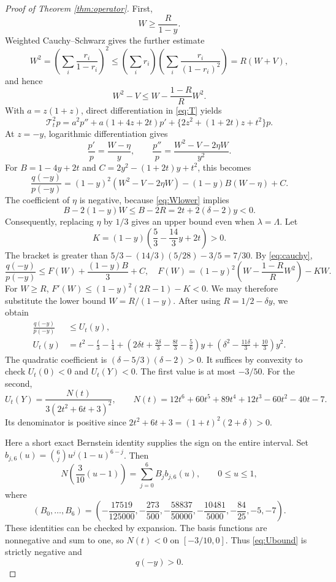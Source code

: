 \documentclass[11pt]{article}
\theoremstyle{remark}
\newcommand{\T}{\mathcal{T}}
\begin{document}
\begin{proof}[Proof of Theorem \ref{thm:operator}]
First,
\begin{equation}\label{eq:Wlower}
 W\ge\frac{R}{1-y}.
\end{equation}
Weighted Cauchy--Schwarz gives the further estimate
\[
 W^2=\left(\sum_i\frac{r_i}{1-r_i}\right)^2
 \le\left(\sum_i r_i\right)
      \left(\sum_i\frac{r_i}{(1-r_i)^2}\right)=R(W+V),
\]
and hence
\begin{equation}\label{eq:cauchy}
 W^2-V\le W-\frac{1-R}{R}W^2.
\end{equation}
With $a=z(1+z)$, direct differentiation in \eqref{eq:T} yields
\[
 \T_t^2p=a^2p''+a(1+4z+2t)p'
              +\{2z^2+(1+2t)z+t^2\}p.
\]
At $z=-y$, logarithmic differentiation gives
\[
 \frac{p'}p=\frac{W-\eta}{y},\qquad
 \frac{p''}p=\frac{W^2-V-2\eta W}{y^2}.
\]
For $B=1-4y+2t$ and $C=2y^2-(1+2t)y+t^2$, this becomes
\begin{equation}\label{eq:quotient}
 \frac{q(-y)}{p(-y)}
 =(1-y)^2(W^2-V-2\eta W)-(1-y)B(W-\eta)+C.
\end{equation}
The coefficient of $\eta$ is negative, because \eqref{eq:Wlower} implies
\[
 B-2(1-y)W\le B-2R=2t+2(\delta-2)y<0.
\]
Consequently, replacing $\eta$ by $1/3$ gives an upper bound even when
$\lambda=\Lambda$. Let
\[
 K=(1-y)\left(\frac53-\frac{14}3y+2t\right)>0.
\]
The bracket is greater than
$5/3-(14/3)(5/28)-3/5=7/30$. By \eqref{eq:cauchy},
\[
 \frac{q(-y)}{p(-y)}\le F(W)+\frac{(1-y)B}{3}+C,
 \quad F(W)=(1-y)^2\left(W-\frac{1-R}{R}W^2\right)-KW.
\]
For $W\ge R$,
$F'(W)\le(1-y)^2(2R-1)-K<0$. We may therefore substitute the
lower bound $W=R/(1-y)$. After using $R=1/2-\delta y$, we obtain
\begin{align}
 \frac{q(-y)}{p(-y)}&\le U_t(y),\label{eq:Ubound}\\
 U_t(y)&=t^2-\frac t3-\frac14
 +\left(2\delta t+\frac{2\delta}3-\frac{8t}3-\frac56\right)y
 +\left(\delta^2-\frac{11\delta}3+\frac{10}3\right)y^2.
 \label{eq:U}
\end{align}
The quadratic coefficient is $(\delta-5/3)(\delta-2)>0$.
It suffices by convexity to check $U_t(0)<0$ and $U_t(Y)<0$.
The first value is at most $-3/50$. For the second,
\begin{equation}\label{eq:N}
 U_t(Y)=\frac{N(t)}{3(2t^2+6t+3)^2},\qquad
 N(t)=12t^6+60t^5+89t^4+12t^3-60t^2-40t-7.
\end{equation}
Its denominator is positive since
$2t^2+6t+3=(1+t)^2(2+\delta)>0$.

Here a short exact Bernstein identity supplies the sign on the entire
interval. Set $b_{j,6}(u)=\binom6j u^j(1-u)^{6-j}$. Then
\begin{equation}\label{eq:bernsteinN}
 N\!\left(\frac3{10}(u-1)\right)=\sum_{j=0}^6 B_j b_{j,6}(u),
 \qquad 0\le u\le1,
\end{equation}
where
\[
 (B_0,\ldots,B_6)=\left(
 -\frac{17519}{125000},-\frac{273}{500},-\frac{58837}{50000},
 -\frac{10481}{5000},-\frac{84}{25},-5,-7\right).
\]
These identities can be checked by expansion. The basis functions are
nonnegative and sum to one, so $N(t)<0$ on $[-3/10,0]$.
Thus \eqref{eq:Ubound} is strictly negative and
\begin{equation}\label{eq:extra-sign}
 q(-y)>0.
\end{equation}


\end{proof}
\end{document}
